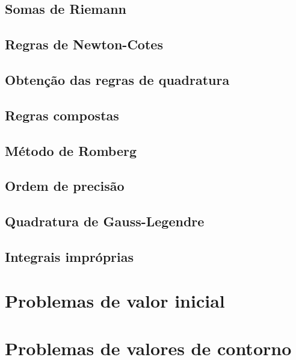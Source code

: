 \documentclass{article}
\theoremstyle{plain}
\theoremstyle{definition}
\theoremstyle{remark}
\begin{document}
\subsection{Somas de Riemann}
\subsection{Regras de Newton-Cotes}
\subsection{Obtenção das regras de quadratura}
\subsection{Regras compostas}
\subsection{Método de Romberg}
\subsection{Ordem de precisão}
\subsection{Quadratura de Gauss-Legendre}
\subsection{Integrais impróprias}

\section{Problemas de valor inicial}
\section{Problemas de valores de contorno}
\end{document}
